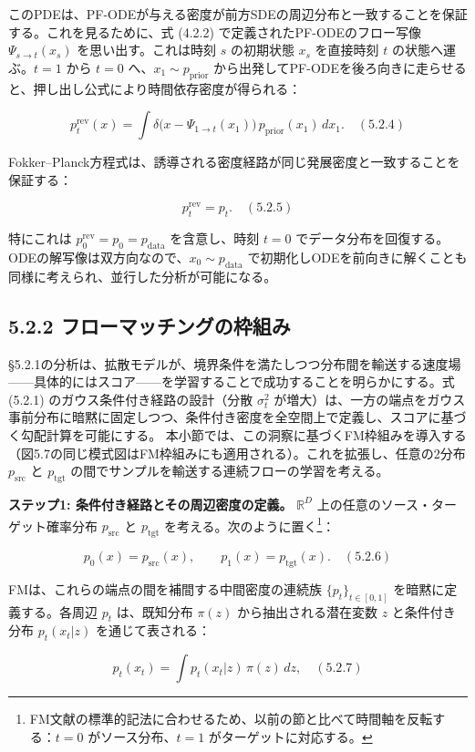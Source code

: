 このPDEは、PF-ODEが与える密度が前方SDEの周辺分布と一致することを保証する。これを見るために、式 (4.2.2) で定義されたPF-ODEのフロー写像 $\Psi_{s\to t}(x_s)$ を思い出す。これは時刻 $s$ の初期状態 $x_s$ を直接時刻 $t$ の状態へ運ぶ。$t=1$ から $t=0$ へ、$x_1\sim p_{\mathrm{prior}}$ から出発してPF-ODEを後ろ向きに走らせると、押し出し公式により時間依存密度が得られる：

\[
p_t^{\mathrm{rev}}(x)=\int \delta\bigl(x-\Psi_{1\to t}(x_1)\bigr)\,p_{\mathrm{prior}}(x_1)\,dx_1. \quad (5.2.4)
\]


Fokker–Planck方程式は、誘導される密度経路が同じ発展密度と一致することを保証する：

\[
p_t^{\mathrm{rev}}=p_t. \quad (5.2.5)
\]


特にこれは $p_0^{\mathrm{rev}}=p_0=p_{\mathrm{data}}$ を含意し、時刻 $t=0$ でデータ分布を回復する。ODEの解写像は双方向なので、$x_0\sim p_{\mathrm{data}}$ で初期化しODEを前向きに解くことも同様に考えられ、並行した分析が可能になる。

\subsection*{5.2.2 フローマッチングの枠組み}


§5.2.1の分析は、拡散モデルが、境界条件を満たしつつ分布間を輸送する速度場——具体的にはスコア——を学習することで成功することを明らかにする。式 (5.2.1) のガウス条件付き経路の設計（分散 $\sigma_t^2$ が増大）は、一方の端点をガウス事前分布に暗黙に固定しつつ、条件付き密度を全空間上で定義し、スコアに基づく勾配計算を可能にする。
本小節では、この洞察に基づくFM枠組みを導入する（図5.7の同じ模式図はFM枠組みにも適用される）。これを拡張し、任意の2分布 $p_{\mathrm{src}}$ と $p_{\mathrm{tgt}}$ の間でサンプルを輸送する連続フローの学習を考える。

\textbf{ステップ1: 条件付き経路とその周辺密度の定義。} $\mathbb{R}^D$ 上の任意のソース・ターゲット確率分布 $p_{\mathrm{src}}$ と $p_{\mathrm{tgt}}$ を考える。次のように置く\footnote{FM文献の標準的記法に合わせるため、以前の節と比べて時間軸を反転する：$t=0$ がソース分布、$t=1$ がターゲットに対応する。}：

\[
p_0(x)=p_{\mathrm{src}}(x),\qquad p_1(x)=p_{\mathrm{tgt}}(x). \quad (5.2.6)
\]


FMは、これらの端点の間を補間する中間密度の連続族 $\{p_t\}_{t\in[0,1]}$ を暗黙に定義する。各周辺 $p_t$ は、既知分布 $\pi(z)$ から抽出される潜在変数 $z$ と条件付き分布 $p_t(x_t|z)$ を通じて表される：

\[
p_t(x_t)=\int p_t(x_t|z)\,\pi(z)\,dz, \quad (5.2.7)
\]


